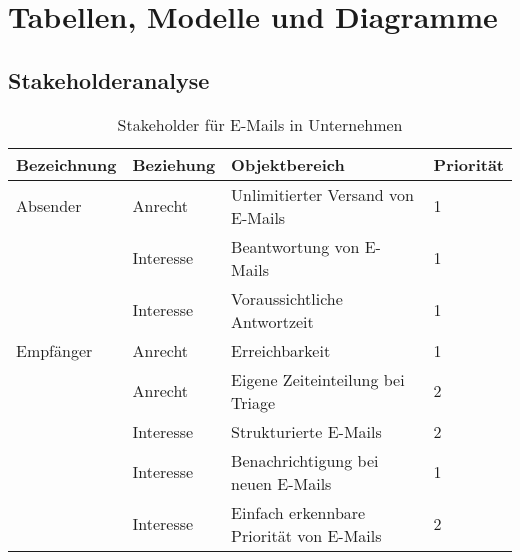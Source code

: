 
\chapter{Tabellen, Modelle und Diagramme}
\label{Tabellen_Modelle_Diagramme}

\section{Stakeholderanalyse}

\begin{table}[H]
	\centering
	\caption[Stakeholderanalyse]{Stakeholder für E-Mails in Unternehmen}
		\vspace{1.0em}	
    \begin{tabular}{|l|l|l|l|}
    \hline
    \textbf{Bezeichnung}                   & \textbf{Beziehung} & \textbf{Objektbereich}                                             & \textbf{Priorität} \\ \hline
    Absender              & Anrecht            & Unlimitierter Versand von E-Mails                                  & 1                  \\ \cline{2-4} 
                                           & Interesse          & Beantwortung von E-Mails                                           & 1                  \\ \cline{2-4} 
                                           & Interesse          & Voraussichtliche Antwortzeit                                       & 1                  \\ \hline
    Empfänger             & Anrecht            & Erreichbarkeit                                                     & 1                  \\ \cline{2-4} 
                                           & Anrecht            & Eigene Zeiteinteilung bei Triage                                   & 2                  \\ \cline{2-4} 
                                           & Interesse          & Strukturierte E-Mails                                              & 2                  \\ \cline{2-4} 
                                           & Interesse          & Benachrichtigung bei neuen E-Mails                                   & 1                  \\ \cline{2-4} 
                                           & Interesse          & Einfach erkennbare Priorität von E-Mails                           & 2                  \\ \hline

\end{tabular}
\end{table}
